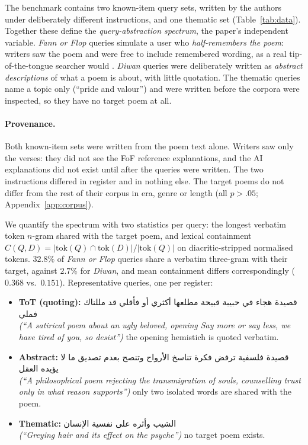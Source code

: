 \documentclass[11pt]{article}
\newcommand{\textarabic}[1]{\foreignlanguage{arabic}{#1}}
\begin{document}
The benchmark contains two known-item query sets, written by the authors under deliberately different instructions, and one thematic set (Table~\ref{tab:data}). Together these define the \emph{query-abstraction spectrum}, the paper's independent variable. \textit{Fann or Flop} queries simulate a user who \emph{half-remembers the poem}: writers saw the poem and were free to include remembered wording, as a real tip-of-the-tongue searcher would \citep{arguello2021tot}. \textit{Diwan} queries were deliberately written as \emph{abstract descriptions} of what a poem is about, with little quotation. The thematic queries name a topic only (``pride and valour'') and were written before the corpora were inspected, so they have no target poem at all.

\paragraph{Provenance.} Both known-item sets were written from the poem text alone. Writers saw only the verses: they did not see the FoF reference explanations, and the AI explanations did not exist until after the queries were written. The two instructions differed in register and in nothing else. The target poems do not differ from the rest of their corpus in era, genre or length (all $p>.05$; Appendix~\ref{app:corpus}).

We quantify the spectrum with two statistics per query: the longest verbatim token $n$-gram shared with the target poem, and lexical containment $C(Q,D)=|\mathrm{tok}(Q)\cap\mathrm{tok}(D)|/|\mathrm{tok}(Q)|$ on diacritic-stripped normalised tokens. $32.8\%$ of \textit{Fann or Flop} queries share a verbatim three-gram with their target, against $2.7\%$ for \textit{Diwan}, and mean containment differs correspondingly ($0.368$ vs.\ $0.151$). Representative queries, one per register:

\begin{itemize}\setlength\itemsep{1pt}\small
  \item \textbf{ToT (quoting):} \textarabic{قصيدة هجاء في حبيبة قبيحة مطلعها أكثري أو فأقلي قد مللناك فملي} \\ \textit{(``A satirical poem about an ugly beloved, opening \emph{Say more or say less, we have tired of you, so desist}'')} the opening hemistich is quoted verbatim.
  \item \textbf{Abstract:} \textarabic{قصيدة فلسفية ترفض فكرة تناسخ الأرواح وتنصح بعدم تصديق ما لا يؤيده العقل} \\ \textit{(``A philosophical poem rejecting the transmigration of souls, counselling trust only in what reason supports'')} only two isolated words are shared with the poem.
  \item \textbf{Thematic:} \textarabic{الشيب وأثره على نفسية الإنسان} \\ \textit{(``Greying hair and its effect on the psyche'')} no target poem exists.
\end{itemize}
\end{document}

